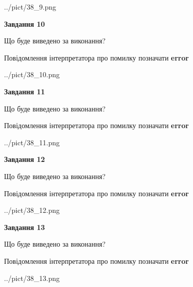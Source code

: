 \documentclass[11pt, ukrainian]{article}
\begin{document}
{\begin {large}
\begin{center}
	{../pict/38_9.png}
\end{center}
\newpage

{\begin {center}\textbf{Завдання 10}\end {center}}\par
Що буде виведено за виконання? \par
Повідомлення інтерпретатора про помилку позначати \textbf{error}

\begin{center}
	{../pict/38_10.png}
\end{center}
\newpage

{\begin {center}\textbf{Завдання 11}\end {center}}\par
Що буде виведено за виконання? \par
Повідомлення інтерпретатора про помилку позначати \textbf{error}

\begin{center}
	{../pict/38_11.png}
\end{center}
\newpage

{\begin {center}\textbf{Завдання 12}\end {center}}\par
Що буде виведено за виконання? \par
Повідомлення інтерпретатора про помилку позначати \textbf{error}

\begin{center}
	{../pict/38_12.png}
\end{center}
\newpage

{\begin {center}\textbf{Завдання 13}\end {center}}\par
Що буде виведено за виконання? \par
Повідомлення інтерпретатора про помилку позначати \textbf{error}

\begin{center}
	{../pict/38_13.png}
\end{center}
\newpage


\end{large}}
\end{document}
